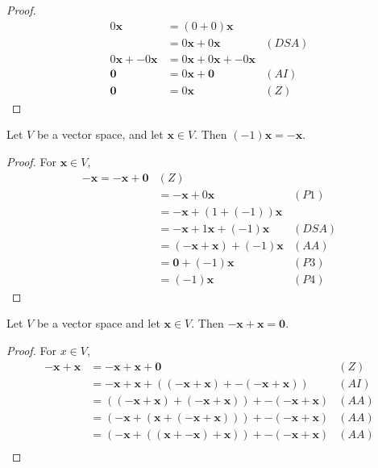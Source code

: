 \begin{itemize}
\begin{proposition}
\begin{proof}
            \begin{align*}
                0\bm{x} &= (0+0)\bm{x} \\ 
                &= 0\bm{x} + 0\bm{x} & (DSA) \\ 
                0\bm{x} + -0\bm{x} &= 0\bm{x} + 0\bm{x} + -0\bm{x} \\ 
                \bm{0} &= 0\bm{x} + \bm{0} & (AI) \\ 
                \bm{0} &= 0\bm{x} & (Z)
            \end{align*}
        \end{proof}
    \end{proposition}
    \begin{proposition}
        Let $V$ be a vector space, and let $\bm{x} \in V$. Then $(-1)\bm{x}=-\bm{x}$.
        \begin{proof}
            For $\bm{x} \in V$,
            \begin{align*}
                -\bm{x} = -\bm{x} + \bm{0} & (Z) \\ 
                &= -\bm{x} + 0\bm{x} & (P1) \\ 
                &= -\bm{x} + (1 + (-1))\bm{x} \\ 
                &= -\bm{x}+1\bm{x}+(-1)\bm{x} & (DSA) \\ 
                &= (-\bm{x}+\bm{x}) + (-1)\bm{x} & (AA) \\ 
                &= \bm{0} + (-1)\bm{x} & (P3) \\ 
                &= (-1)\bm{x} & (P4)
            \end{align*}
        \end{proof}
    \end{proposition}
    \begin{proposition}
        Let $V$ be a vector space and let $\bm{x} \in V$. Then $-\bm{x}+\bm{x}=\bm{0}$.
        \begin{proof}
            For $x \in V$,
            \begin{align*}
                -\bm{x}+\bm{x} &= -\bm{x}+\bm{x} + \bm{0} & (Z) \\ 
                &= -\bm{x}+\bm{x}+\left((-\bm{x}+\bm{x})+-(\bm{-x}+\bm{x})\right) & (AI) \\ 
                &= ((-\bm{x}+\bm{x})+(-\bm{x}+\bm{x}))+-(-\bm{x}+\bm{x}) & (AA) \\ 
                &= (-\bm{x}+(\bm{x}+(-\bm{x}+\bm{x}))) +-(-\bm{x}+\bm{x}) & (AA) \\ 
                &= (-\bm{x}+((\bm{x}+-\bm{x})+\bm{x}))+-(-\bm{x}+\bm{x}) & (AA) \\ 

\end{align*}
\end{proof}
\end{proposition}
\end{itemize}

